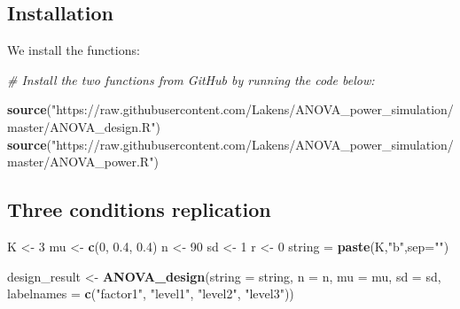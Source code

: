 \documentclass[]{article}
\newenvironment{Shaded}{\begin{snugshade}}{\end{snugshade}}
\newcommand{\KeywordTok}[1]{\textcolor[rgb]{0.13,0.29,0.53}{\textbf{#1}}}
\newcommand{\DataTypeTok}[1]{\textcolor[rgb]{0.13,0.29,0.53}{#1}}
\newcommand{\DecValTok}[1]{\textcolor[rgb]{0.00,0.00,0.81}{#1}}
\newcommand{\FloatTok}[1]{\textcolor[rgb]{0.00,0.00,0.81}{#1}}
\newcommand{\StringTok}[1]{\textcolor[rgb]{0.31,0.60,0.02}{#1}}
\newcommand{\CommentTok}[1]{\textcolor[rgb]{0.56,0.35,0.01}{\textit{#1}}}
\newcommand{\NormalTok}[1]{#1}
\begin{document}
\subsection{Installation}\label{installation}

We install the functions:

\begin{Shaded}
\begin{Highlighting}[]
\CommentTok{# Install the two functions from GitHub by running the code below:}

\KeywordTok{source}\NormalTok{(}\StringTok{"https://raw.githubusercontent.com/Lakens/ANOVA_power_simulation/master/ANOVA_design.R"}\NormalTok{)}
\KeywordTok{source}\NormalTok{(}\StringTok{"https://raw.githubusercontent.com/Lakens/ANOVA_power_simulation/master/ANOVA_power.R"}\NormalTok{)}
\end{Highlighting}
\end{Shaded}

\subsection{Three conditions
replication}\label{three-conditions-replication}

\begin{Shaded}
\begin{Highlighting}[]
\NormalTok{K <-}\StringTok{ }\DecValTok{3}
\NormalTok{mu <-}\StringTok{ }\KeywordTok{c}\NormalTok{(}\DecValTok{0}\NormalTok{, }\FloatTok{0.4}\NormalTok{, }\FloatTok{0.4}\NormalTok{)}
\NormalTok{n <-}\StringTok{ }\DecValTok{90}
\NormalTok{sd <-}\StringTok{ }\DecValTok{1}
\NormalTok{r <-}\StringTok{ }\DecValTok{0}
\NormalTok{string =}\StringTok{ }\KeywordTok{paste}\NormalTok{(K,}\StringTok{"b"}\NormalTok{,}\DataTypeTok{sep=}\StringTok{""}\NormalTok{)}
\end{Highlighting}
\end{Shaded}

\begin{Shaded}
\begin{Highlighting}[]
\NormalTok{design_result <-}\StringTok{ }\KeywordTok{ANOVA_design}\NormalTok{(}\DataTypeTok{string =}\NormalTok{ string,}
                   \DataTypeTok{n =}\NormalTok{ n, }
                   \DataTypeTok{mu =}\NormalTok{ mu, }
                   \DataTypeTok{sd =}\NormalTok{ sd, }
                   \DataTypeTok{labelnames =} \KeywordTok{c}\NormalTok{(}\StringTok{"factor1"}\NormalTok{, }\StringTok{"level1"}\NormalTok{, }\StringTok{"level2"}\NormalTok{, }\StringTok{"level3"}\NormalTok{))}
\end{Highlighting}
\end{Shaded}
\end{document}
